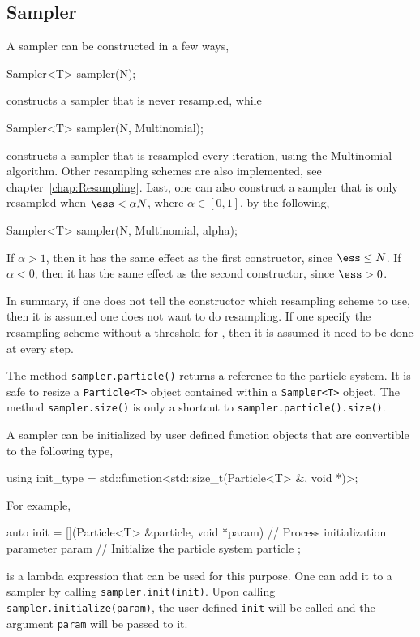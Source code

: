 \subsection{Sampler}
\label{sub:Sampler}

A sampler can be constructed in a few ways,
\begin{cppcode}
  Sampler<T> sampler(N);
\end{cppcode}
constructs a sampler that is never resampled, while
\begin{cppcode}
  Sampler<T> sampler(N, Multinomial);
\end{cppcode}
constructs a sampler that is resampled every iteration, using the Multinomial
algorithm. Other resampling schemes are also implemented, see
chapter~\ref{chap:Resampling}. Last, one can also construct a sampler that is
only resampled when $\ess < \alpha N$, where $\alpha\in[0, 1]$, by the
following,
\begin{cppcode}
  Sampler<T> sampler(N, Multinomial, alpha);
\end{cppcode}
If $\alpha > 1$, then it has the same effect as the first constructor, since
$\ess \le N$. If $\alpha < 0$, then it has the same effect as the second
constructor, since $\ess > 0$.

In summary, if one does not tell the constructor which resampling scheme to
use, then it is assumed one does not want to do resampling. If one specify the
resampling scheme without a threshold for \ess, then it is assumed it need to
be done at every step.

The method \verb|sampler.particle()| returns a reference to the particle
system. It is safe to resize a \verb|Particle<T>| object contained within a
\verb|Sampler<T>| object. The method \verb|sampler.size()| is only a shortcut
to \verb|sampler.particle().size()|.

A sampler can be initialized by user defined function objects that are
convertible to the following type,
\begin{cppcode}
  using init_type = std::function<std::size_t(Particle<T> &, void *)>;
\end{cppcode}
For example,
\begin{cppcode}
  auto init = [](Particle<T> &particle, void *param) {
      // Process initialization parameter param
      // Initialize the particle system particle
  };
\end{cppcode}
is a \cppoo lambda expression that can be used for this purpose. One can add it
to a sampler by calling \verb|sampler.init(init)|. Upon calling
\verb|sampler.initialize(param)|, the user defined \verb|init| will be called
and the argument \verb|param| will be passed to it.

